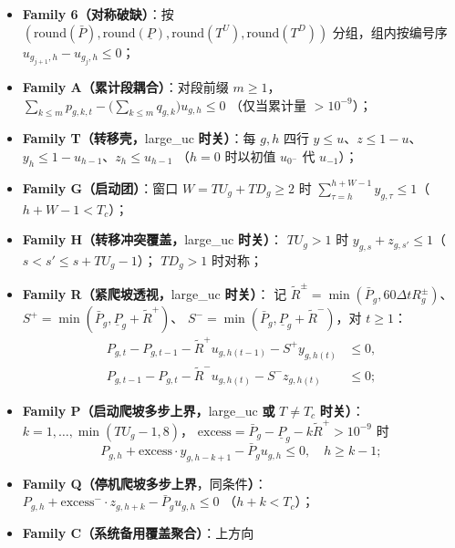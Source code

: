 \begin{itemize}
  \item \textbf{Family 6（对称破缺）}：按
        $(\mathrm{round}(\bar P),\mathrm{round}(\underline P),\mathrm{round}(T^U),
        \mathrm{round}(T^D))$ 分组，组内按编号序
        $u_{g_{j+1},h}-u_{g_j,h}\le 0$；
  \item \textbf{Family A（累计段耦合）}：对段前缀 $m\ge 1$，
        $\sum_{k\le m}p_{g,k,t}-\big(\sum_{k\le m}q_{g,k}\big)u_{g,h}\le 0$
        （仅当累计量 $>10^{-9}$）；
  \item \textbf{Family T（转移壳，}large\_uc \textbf{时关）}：每 $g,h$ 四行
        $y\le u$、$z\le 1-u$、$y_h\le 1-u_{h-1}$、$z_h\le u_{h-1}$
        （$h=0$ 时以初值 $u_{0^-}$ 代 $u_{-1}$）；
  \item \textbf{Family G（启动团）}：窗口 $W=TU_g+TD_g\ge 2$ 时
        $\sum_{\tau=h}^{h+W-1}y_{g,\tau}\le 1$（$h+W-1<T_c$）；
  \item \textbf{Family H（转移冲突覆盖，}large\_uc \textbf{时关）}：
        $TU_g>1$ 时 $y_{g,s}+z_{g,s'}\le 1$（$s<s'\le s+TU_g-1$）；
        $TD_g>1$ 时对称；
  \item \textbf{Family R（紧爬坡透视，}large\_uc \textbf{时关）}：
        记 $\tilde R^\pm=\min(\bar P_g,60\Delta t R^\pm_g)$、
        $S^+=\min(\bar P_g,\underline P_g+\tilde R^+)$、
        $S^-=\min(\bar P_g,\underline P_g+\tilde R^-)$，对 $t\ge 1$：
        \begin{align}
        P_{g,t}-P_{g,t-1}-\tilde R^+ u_{g,h(t-1)}-S^+ y_{g,h(t)}&\le 0,
        \label{eq:impl-famr}\\
        P_{g,t-1}-P_{g,t}-\tilde R^- u_{g,h(t)}-S^- z_{g,h(t)}&\le 0;
        \nonumber
        \end{align}
  \item \textbf{Family P（启动爬坡多步上界，}large\_uc \textbf{或}
        $T\ne T_c$ \textbf{时关）}：$k=1,\dots,\min(TU_g-1,8)$，
        $\mathrm{excess}=\bar P_g-\underline P_g-k\tilde R^+>10^{-9}$ 时
        \begin{equation}
        P_{g,h}+\mathrm{excess}\cdot y_{g,h-k+1}-\bar P_g u_{g,h}\le 0,
        \quad h\ge k-1;
        \label{eq:impl-famp}
        \end{equation}
  \item \textbf{Family Q（停机爬坡多步上界}，同条件\textbf{）}：
        $P_{g,h}+\mathrm{excess}^-\cdot z_{g,h+k}-\bar P_g u_{g,h}\le 0$
        （$h+k<T_c$）；
  \item \textbf{Family C（系统备用覆盖聚合）}：上方向
        \begin{equation}

\end{equation}
\end{itemize}
